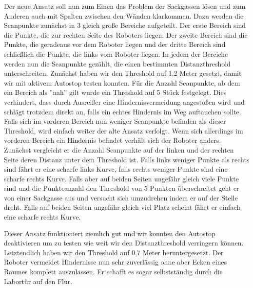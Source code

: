 Der neue Ansatz soll nun zum Einen das Problem der Sackgassen lösen und zum Anderen auch mit Spalten zwischen den Wänden klarkommen. Dazu werden die Scanpunkte zunächst in 3 gleich große Bereiche aufgeteilt. Der erste Bereich sind die Punkte, die zur rechten Seite des Roboters liegen. Der zweite Bereich sind die Punkte, die geradeaus vor dem Roboter liegen und der dritte Bereich sind schließlich die Punkte, die links vom Roboter liegen. In jedem der Bereiche werden nun die Scanpunkte gezählt, die einen bestimmten Distanzthreshold unterschreiten. Zunächst haben wir den Threshold auf 1,2 Meter gesetzt, damit wir mit aktivem Autostop testen konnten.
Für die Anzahl Scanpunkte, ab dem ein Bereich als ''nah'' gilt wurde ein Threshold auf 5 Stück festgelegt. Dies verhindert, dass durch Ausreißer eine Hindernisvermeidung angestoßen wird und schlägt trotzdem direkt an, falls ein echtes Hindernis im Weg auftauchen sollte.
Falls sich im vorderen Bereich nun weniger Scanpunkte befinden als dieser Threshold, wird einfach weiter der alte Ansatz verfolgt. Wenn sich allerdings im vorderen Bereich ein Hindernis befindet verhält sich der Roboter anders. Zunächst vergleicht er die Anzahl Scanpunkte auf der linken und der rechten Seite deren Distanz unter dem Threshold ist. Falls links weniger Punkte als rechts sind fährt er eine scharfe links Kurve, falls rechts weniger Punkte sind eine scharfe rechts Kurve. Falls aber auf beiden Seiten ungefähr gleich viele Punkte sind und die Punkteanzahl den Threshold von 5 Punkten überschreitet geht er von einer Sackgasse aus und versucht sich umzudrehen indem er auf der Stelle dreht. Falls auf beiden Seiten ungefähr gleich viel Platz scheint fährt er einfach eine scharfe rechts Kurve.

Dieser Ansatz funktioniert ziemlich gut und wir konnten den Autostop deaktivieren um zu testen wie weit wir den Distanzthreshold verringern können. Letztendlich haben wir den Threshold auf 0,7 Meter heruntergesetzt. Der Roboter vermeidet Hindernisse nun sehr zuverlässig ohne aber Ecken eines Raumes komplett auszulassen. Er schafft es sogar selbstständig durch die Labortür auf den Flur.